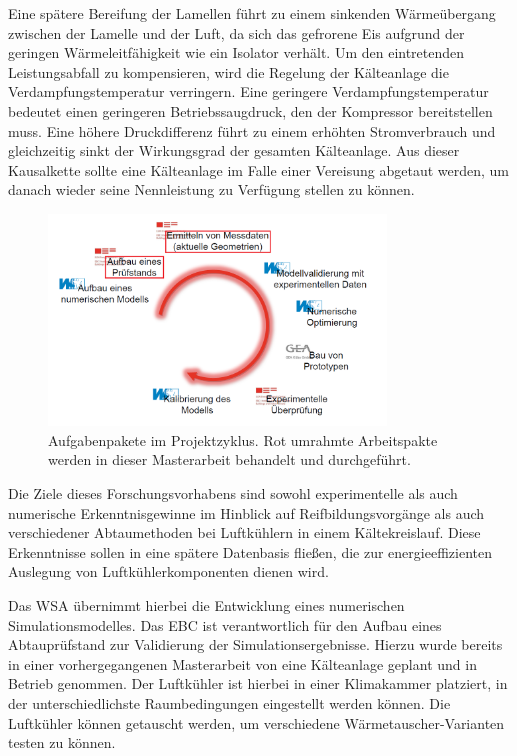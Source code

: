 Eine spätere Bereifung der Lamellen führt zu einem sinkenden Wärmeübergang zwischen der Lamelle und der Luft, da sich das gefrorene Eis aufgrund der geringen Wärmeleitfähigkeit wie ein Isolator verhält. Um den eintretenden Leistungsabfall zu kompensieren, wird die Regelung der Kälteanlage die Verdampfungstemperatur verringern. Eine geringere Verdampfungstemperatur bedeutet einen geringeren Betriebssaugdruck, den der Kompressor bereitstellen muss. Eine höhere Druckdifferenz führt zu einem erhöhten Stromverbrauch und gleichzeitig sinkt der Wirkungsgrad der gesamten Kälteanlage.
Aus dieser Kausalkette sollte eine Kälteanlage im Falle einer Vereisung abgetaut werden, um danach wieder seine Nennleistung zu Verfügung stellen zu können.

 \begin{figure}[htb]
	\centering
		\includegraphics[width=0.80\textwidth]{Pictures/Projektablauf.png}
	\caption{Aufgabenpakete im Projektzyklus.\citep{Freitag2015} Rot umrahmte Arbeitspakte werden in dieser Masterarbeit behandelt und durchgeführt.}
	\label{fig:Aufgabenpakete}
\end{figure}

Die Ziele dieses Forschungsvorhabens sind sowohl experimentelle als auch numerische Erkenntnisgewinne im Hinblick auf Reifbildungsvorgänge als auch verschiedener Abtaumethoden bei Luftkühlern in einem Kältekreislauf. Diese Erkenntnisse sollen in eine spätere Datenbasis fließen, die zur energieeffizienten Auslegung von Luftkühlerkomponenten dienen wird.

Das WSA übernimmt hierbei die Entwicklung eines numerischen Simulationsmodelles. Das EBC ist verantwortlich für den Aufbau eines Abtauprüfstand zur Validierung der Simulationsergebnisse. Hierzu wurde bereits in einer vorhergegangenen Masterarbeit von \citeauthor{Helmlinger2015} eine Kälteanlage geplant und in Betrieb genommen. Der Luftkühler ist hierbei in einer Klimakammer platziert, in der unterschiedlichste Raumbedingungen eingestellt werden können. Die Luftkühler können getauscht werden, um verschiedene Wärmetauscher-Varianten testen zu können.

